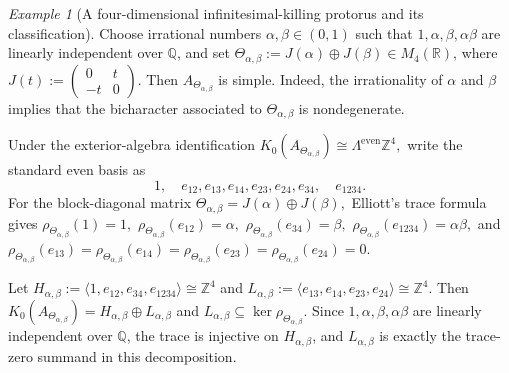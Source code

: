 \documentclass[11pt]{amsart}
\theoremstyle{definition}
\theoremstyle{remark}
\newtheorem{example}[theorem]{Example}
\newcommand{\Z}{\mathbb{Z}}
\newcommand{\R}{\mathbb{R}}
\newcommand{\Q}{\mathbb Q}
\begin{document}
\begin{example}[A four-dimensional infinitesimal-killing protorus and its classification]
\label{ex:infinitesimal-killing}
Choose irrational numbers $\alpha,\beta\in(0,1)$
such that $1,\alpha,\beta,\alpha\beta$
are linearly independent over $\Q$, and set $\Theta_{\alpha,\beta}:=J(\alpha)\oplus J(\beta)\in M_4(\R)$, where 
$J(t):=
\begin{pmatrix}
0&t\\
-t&0
\end{pmatrix}.$
Then $A_{\Theta_{\alpha,\beta}}$ is simple. Indeed, the irrationality of $\alpha$ and $\beta$ implies that the bicharacter associated to
$\Theta_{\alpha,\beta}$ is nondegenerate.

Under the exterior-algebra identification $K_0(A_{\Theta_{\alpha,\beta}})
\cong
\Lambda^{\mathrm{even}}\Z^4,$
write the standard even basis as
\[
1,\quad
e_{12},e_{13},e_{14},e_{23},e_{24},e_{34},\quad
e_{1234}.
\]
For the block-diagonal matrix $\Theta_{\alpha,\beta}=J(\alpha)\oplus J(\beta),$
Elliott's trace formula gives $\rho_{\Theta_{\alpha,\beta}}(1)=1,$
$\rho_{\Theta_{\alpha,\beta}}(e_{12})=\alpha,$ $\rho_{\Theta_{\alpha,\beta}}(e_{34})=\beta,$
$\rho_{\Theta_{\alpha,\beta}}(e_{1234})=\alpha\beta,$ and $\rho_{\Theta_{\alpha,\beta}}(e_{13})
=
\rho_{\Theta_{\alpha,\beta}}(e_{14})
=
\rho_{\Theta_{\alpha,\beta}}(e_{23})
=
\rho_{\Theta_{\alpha,\beta}}(e_{24})
=
0.$

Let $H_{\alpha,\beta}
:=
\langle 1,e_{12},e_{34},e_{1234}\rangle
\cong\Z^4$
and $L_{\alpha,\beta}
:=
\langle e_{13},e_{14},e_{23},e_{24}\rangle
\cong\Z^4.$
Then $K_0(A_{\Theta_{\alpha,\beta}})
=
H_{\alpha,\beta}\oplus L_{\alpha,\beta}$
and 
$L_{\alpha,\beta}\subseteq \ker\rho_{\Theta_{\alpha,\beta}}.$
Since $1,\alpha,\beta,\alpha\beta$ are linearly independent over $\Q$, the
trace is injective on $H_{\alpha,\beta}$, and $L_{\alpha,\beta}$ is exactly
the trace-zero summand in this decomposition.


\end{example}
\end{document}
